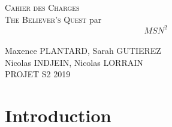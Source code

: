 \documentclass[]{extarticle}
\begin{document}
\textsc{ }\\
\textsc{ }\\
\textsc{ }\\
\textsc{ }\\
\textsc{ }\\

\begin{center}
\textsc{\LARGE Cahier des Charges} \\
\bigbreak
\bigbreak
\bigbreak
\textsc{\Huge The Believer's Quest}
\bigbreak
\bigbreak
\bigbreak
\bigbreak
\bigbreak
\bigbreak
\bigbreak
\bigbreak
\bigbreak
\bigbreak
\bigbreak
\bigbreak
\bigbreak
par \\
\[MSN^{2}\]\\
Maxence PLANTARD, Sarah GUTIEREZ \\
Nicolas INDJEIN, Nicolas LORRAIN \\
\bigbreak
\bigbreak
\bigbreak
PROJET S2 2019
\end{center}
\newpage

\renewcommand{\contentsname}{Sommaire}
\tableofcontents
\newpage

\section{Introduction}
\end{document}
